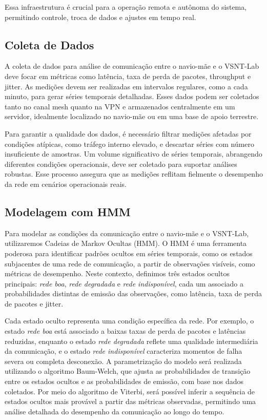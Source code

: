 Essa infraestrutura é crucial para a operação remota e autônoma do sistema, permitindo controle, troca de dados e ajustes em tempo real.

\subsection{Coleta de Dados}
A coleta de dados para análise de comunicação entre o navio-mãe e o VSNT-Lab deve focar em métricas como latência, taxa de perda de pacotes, throughput e jitter. As medições devem ser realizadas em intervalos regulares, como a cada minuto, para gerar séries temporais detalhadas. Esses dados podem ser coletados tanto no canal mesh quanto na VPN e armazenados centralmente em um servidor, idealmente localizado no navio-mãe ou em uma base de apoio terrestre.

Para garantir a qualidade dos dados, é necessário filtrar medições afetadas por condições atípicas, como tráfego interno elevado, e descartar séries com número insuficiente de amostras. Um volume significativo de séries temporais, abrangendo diferentes condições operacionais, deve ser coletado para suportar análises robustas. Esse processo assegura que as medições reflitam fielmente o desempenho da rede em cenários operacionais reais.

\subsection{Modelagem com HMM}
Para modelar as condições da comunicação entre o navio-mãe e o VSNT-Lab, utilizaremos Cadeias de Markov Ocultas (HMM). O HMM é uma ferramenta poderosa para identificar padrões ocultos em séries temporais, como os estados subjacentes de uma rede de comunicação, a partir de observações visíveis, como métricas de desempenho. Neste contexto, definimos três estados ocultos principais: \textit{rede boa}, \textit{rede degradada} e \textit{rede indisponível}, cada um associado a probabilidades distintas de emissão das observações, como latência, taxa de perda de pacotes e jitter.

Cada estado oculto representa uma condição específica da rede. Por exemplo, o estado \textit{rede boa} está associado a baixas taxas de perda de pacotes e latências reduzidas, enquanto o estado \textit{rede degradada} reflete uma qualidade intermediária da comunicação, e o estado \textit{rede indisponível} caracteriza momentos de falha severa ou completa desconexão. A parametrização do modelo será realizada utilizando o algoritmo Baum-Welch, que ajusta as probabilidades de transição entre os estados ocultos e as probabilidades de emissão, com base nos dados coletados. Por meio do algoritmo de Viterbi, será possível inferir a sequência de estados ocultos mais provável a partir das métricas observadas, permitindo uma análise detalhada do desempenho da comunicação ao longo do tempo.

